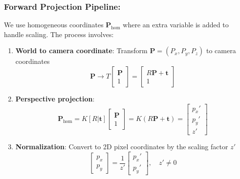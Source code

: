 \documentclass[12pt]{article}
\begin{document}
\subsubsection*{Forward Projection Pipeline:}
We use homogeneous coordinates \( \mathbf{P}_{\text{hom}} \) where an extra variable is added to handle scaling. The process involves:
\begin{enumerate}
    \item \textbf{World to camera coordinate}: Transform \( \mathbf{P} = (P_x, P_y, P_z) \) to camera coordinates
    \begin{equation}
        \mathbf{P} \to T \begin{bmatrix} \mathbf{P} \\ 1 \end{bmatrix} = \begin{bmatrix} R \mathbf{P} + \mathbf{t} \\ 1 \end{bmatrix} \label{eq:world2cam}
    \end{equation}
    \item \textbf{Perspective projection}: 
    \begin{equation}
        \mathbf{P}_{\text{hom}} = K [R | \mathbf{t}] \begin{bmatrix} \mathbf{P} \\ 1 \end{bmatrix} = K (R \mathbf{P} + \mathbf{t}) = \begin{bmatrix} p_x' \\ p_y' \\ z' \end{bmatrix} \label{eq:persp}
    \end{equation}

    \item \textbf{Normalization}: Convert to 2D pixel coordinates by the scaling factor \( z' \)
    \begin{equation}
        \begin{bmatrix} p_x \\ p_y \end{bmatrix} = \frac{1}{z'} \begin{bmatrix} p_x' \\ p_y' \end{bmatrix}, \quad z' \neq 0 \label{eq:norm}
    \end{equation}
\end{enumerate}
\end{document}
